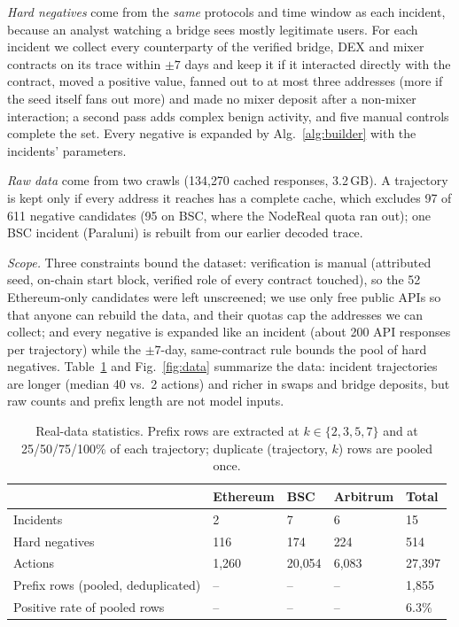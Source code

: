 \documentclass[runningheads]{llncs}
\newcommand{\1}{\mathbb{1}}
\begin{document}
\emph{Hard negatives} come from the \emph{same} protocols and time window as each incident, because an analyst watching a bridge sees mostly legitimate users.
For each incident we collect every counterparty of the verified bridge, DEX and mixer contracts on its trace within $\pm7$ days and keep it if it interacted directly with the contract, moved a positive value, fanned out to at most three addresses (more if the seed itself fans out more) and made no mixer deposit after a non-mixer interaction; a second pass adds complex benign activity, and five manual controls complete the set.
Every negative is expanded by Alg.~\ref{alg:builder} with the incidents' parameters.

\emph{Raw data} come from two crawls (134{,}270 cached responses, 3.2\,GB). A trajectory is kept only if every address it reaches has a complete cache, which excludes 97 of 611 negative candidates (95 on BSC, where the NodeReal quota ran out); one BSC incident (Paraluni) is rebuilt from our earlier decoded trace.

\emph{Scope.} Three constraints bound the dataset: verification is manual (attributed seed, on-chain start block, verified role of every contract touched), so the 52 Ethereum-only candidates were left unscreened; we use only free public APIs so that anyone can rebuild the data, and their quotas cap the addresses we can collect; and every negative is expanded like an incident (about 200 API responses per trajectory) while the $\pm7$-day, same-contract rule bounds the pool of hard negatives.
Table~\ref{tab:data} and Fig.~\ref{fig:data} summarize the data: incident trajectories are longer (median 40 vs.\ 2 actions) and richer in swaps and bridge deposits, but raw counts and prefix length are not model inputs.

\begin{table}[t]
\centering
\caption{Real-data statistics. Prefix rows are extracted at $k\in\{2,3,5,7\}$ and at 25/50/75/100\% of each trajectory; duplicate (trajectory, $k$) rows are pooled once.}
\label{tab:data}
\small
\begin{tabular*}{\linewidth}{@{\extracolsep{\fill}}lllll@{}}
\toprule
 & Ethereum & BSC & Arbitrum & Total \\
\midrule
Incidents & 2 & 7 & 6 & 15 \\
Hard negatives & 116 & 174 & 224 & 514 \\
Actions & 1{,}260 & 20{,}054 & 6{,}083 & 27{,}397 \\
Prefix rows (pooled, deduplicated) & -- & -- & -- & 1{,}855 \\
Positive rate of pooled rows & -- & -- & -- & 6.3\% \\
\bottomrule
\end{tabular*}
\end{table}
\end{document}
